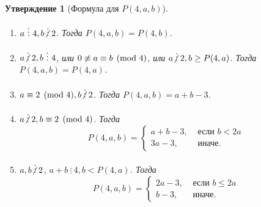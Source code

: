 \documentclass[12pt]{article}
\newtheorem{proposition}[theorem]{Утверждение}
\begin{document}
\begin{proposition}[Формула для $P(4, a, b)$] { \ }

\begin{enumerate}
	\item $a \ \vdots \ 4, b \centernot \vdots 2$. Тогда $P(4, a, b) = P(4, b)$.

	\item $a \centernot \vdots 2, b \ \vdots \ 4$, или $0 \centernot \equiv a \equiv b \pmod 4$, или $a \centernot\vdots 2, b \ge P(4, a)$. Тогда $P(4, a, b) = P(4, a)$.
	
	\item $a \equiv 2 \pmod 4, b \centernot \vdots 2$. Тогда $P(4, a, b) = a + b - 3$.
		
	\item $a \centernot\vdots 2, b \equiv 2 \pmod 4$. Тогда
	\begin{equation*}
		P(4, a, b) = \begin{cases}
			a + b - 3, &\text{ если } b < 2a \\
			3a - 3,  &\text{ иначе.}
		\end{cases}
	\end{equation*}		

	\item $a, b \centernot \vdots 2$, $a + b \ \vdots \ 4, b < P(4, a)$. Тогда \begin{equation*}
		P(4, a, b) = \begin{cases}
			2a - 3, &\text{ если } b \le 2a \\
			b - 3,  &\text{ иначе.}
		\end{cases}
	\end{equation*}
\end{enumerate}
\end{proposition}
\end{document}
